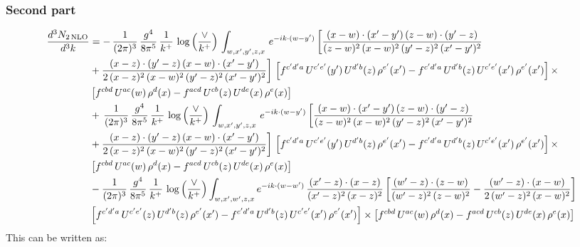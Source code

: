 \documentclass[9pt]{article}
\numberwithin{equation}{section}
\begin{document}
\subsubsection{Second part}
\begin{align}
 \frac{d^{3}N_{2\,\rm NLO}}{d^{3}k} & =    -\, \frac{1}{(2\pi)^{3}}\,\frac{g^{4}}{8\pi^{5}}\,\frac{1}{k^{+}}\,\log{\left(\frac{\vee}{k^{+}}\right)}\,\int_{w,x',y',z,x}\, e^{-ik\cdot (w-y')}\,\bigg[\frac{(x-w)\cdot (x'-y')\,(z-w)\cdot (y'-z)}{(z-w)^{2}\,(x-w)^{2}\,(y'-z)^{2}\,(x'-y')^{2}}\notag \\ & +\frac{(x-z)\cdot (y'-z)\,(x-w)\cdot (x'-y')}{2\,(x-z)^{2}\,(x-w)^{2}\,(y'-z)^{2}\,(x'-y')^{2}}\bigg]\, \left[f^{c'd'a}\,U^{c'e'}(y')\,U^{d'b}(z)\,\rho^{e'}(x')-f^{c'd'a}\, 
    U^{d'b}(z)\,U^{c'e'}(x')\,\rho^{e'}(x')\right]\times\notag \\ &  \left[f^{cbd}\,U^{ac}(w)\,\rho^{d}(x) -f^{acd}\,U^{cb}(z)\,U^{de}(x)\,\rho^{e}(x)\right] \notag \\
&   +\, \frac{1}{(2\pi)^{3}}\,\frac{g^{4}}{8\pi^{5}}\,\frac{1}{k^{+}}\,\log{\left(\frac{\vee}{k^{+}}\right)}\,\int_{w,x',y',z,x}\, e^{-ik\cdot (w-y')}\,\bigg[\frac{(x-w)\cdot (x'-y')\,(z-w)\cdot (y'-z)}{(z-w)^{2}\,(x-w)^{2}\,(y'-z)^{2}\,(x'-y')^{2}}\notag \\ &   +\frac{(x-z)\cdot (y'-z)\,(x-w)\cdot (x'-y')}{2\,(x-z)^{2}\,(x-w)^{2}\,(y'-z)^{2}\,(x'-y')^{2}}\bigg]\, \left[f^{c'd'a}\,U^{c'e'}(y')\,U^{d'b}(z)\,\rho^{e'}(x')-f^{c'd'a}\, 
    U^{d'b}(z)\,U^{c'e'}(x')\,\rho^{e'}(x')\right]\times\notag \\ &    \left[f^{cbd}\,U^{ac}(w)\,\rho^{d}(x) -f^{acd}\,U^{cb}(z)\,U^{de}(x)\,\rho^{e}(x)\right] \notag \\
&   -\frac{1}{(2\pi)^{3}}\,\frac{g^{4}}{8\pi^{5}}\,\frac{1}{k^{+}}\,\log{\left(\frac{\vee}{k^{+}}\right)}\int_{w,x',w',z,x} e^{-ik\cdot (w-w')}\,\frac{(x'-z)\cdot (x-z)}{(x'-z)^{2}\,(x-z)^{2}}\,\bigg[\frac{(w'-z)\cdot (z-w)}{(w'-z)^{2}\,(z-w)^{2}}-\frac{(w'-z)\cdot (x-w)}{2\,(w'-z)^{2}\,(x-w)^{2}}\bigg]\notag \\
&   \left[f^{c'd'a}\,U^{c'e'}(z)\,U^{d'b}(z)\,\rho^{e'}(x')-f^{c'd'a}\, U^{d'b}(z)\,U^{c'e'}(x')\,\rho^{e'}(x')\right] \times\left[f^{cbd}\,U^{ac}(w)\,\rho^{d}(x) -f^{acd}\,U^{cb}(z)\,U^{de}(x)\,\rho^{e}(x)\right]
\end{align}
This can be written as:
\end{document}
